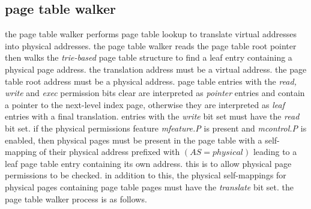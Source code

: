 \subsection{page table walker}

the page table walker performs page table lookup to translate virtual
addresses into physical addresses.
the page table walker reads the page table root pointer then walks the
\emph{trie-based} page table structure to find a leaf entry containing
a physical page address.
the translation address must be a virtual address.
the page table root address must be a physical address.
\para
page table entries with the \emph{read, write} and \emph{exec} permission
bits clear are interpreted as \emph{pointer} entries and contain a pointer
to the next-level index page, otherwise they are interpreted as \emph{leaf}
entries with a final translation. entries with the \emph{write} bit set
must have the \emph{read} bit set.
\para
if the physical permissions feature \emph{mfeature.P} is present and
\emph{mcontrol.P} is enabled, then physical pages must be present in the
page table with a self-mapping of their physical address prefixed with
$(\mathit{AS} = \mathit{physical})$ leading to a leaf page table entry
containing its own address. this is to allow physical page permissions
to be checked. in addition to this, the physical self-mappings for physical
pages containing page table pages must have the \emph{translate} bit set.
\para
the page table walker process is as follows.

